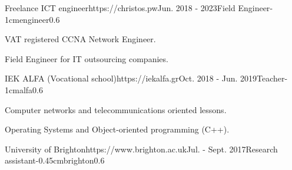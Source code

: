 \documentclass{mycv}
\begin{document}
	\vspace*{0.5cm}
	
	\begin{EntryDatedLogo}{Freelance ICT engineer}{https://christos.pw}{Jun. 2018 - 2023}{Field Engineer}{-1cm}{engineer}{0.6}
		\begin{Itemize}
			\item VAT registered CCNA Network Engineer.
			\item Field Engineer for IT outsourcing companies.
		\end{Itemize}
	\end{EntryDatedLogo}

	\vspace*{0.5cm}	



	\begin{EntryDatedLogo}{IEK ALFA (Vocational school)}{https://iekalfa.gr}{Oct. 2018 - Jun. 2019}{Teacher}{-1cm}{alfa}{0.6}
		\begin{Itemize}
			\item Computer networks and telecommunications oriented lessons.
			\item Operating Systems and Object-oriented programming (C++).
		\end{Itemize}
	\end{EntryDatedLogo}

	\vspace*{0.5cm}
		
	\begin{EntryDatedLogo}{University of Brighton}{https://www.brighton.ac.uk}{Jul. - Sept. 2017}{Research assistant}{-0.45cm}{brighton}{0.6}
	\end{EntryDatedLogo}
\end{document}
